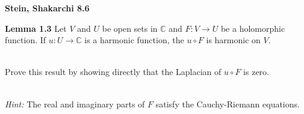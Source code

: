 \textbf{Stein, Shakarchi 8.6}

\textbf{Lemma 1.3} Let $V$ and $U$ be open sets in $\mathbb{C}$ and $F: V \to U$ be a holomorphic function. If 
$u: U \to \mathbb{C}$ is a harmonic function, the $u \circ F$ is harmonic on $V$.

\ \\
Prove this result by showing directly that the Laplacian of $u \circ F$ is zero.

\ \\
\textit{Hint:} The real and imaginary parts of $F$ satisfy the Cauchy-Riemann equations.

\begin{solution}
  \ \\
\end{solution}
